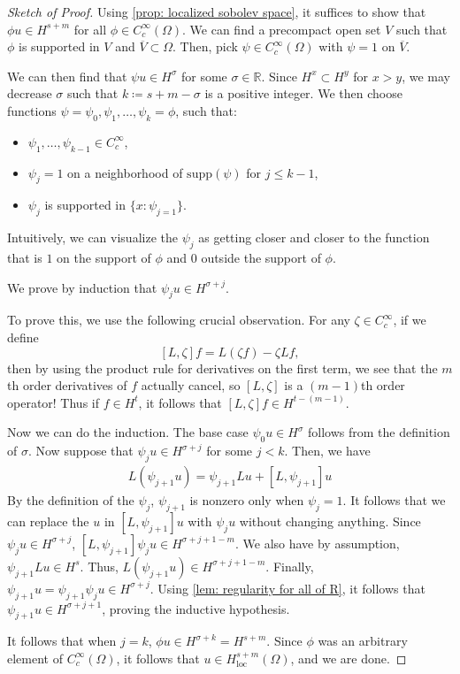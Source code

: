 \documentclass[12pt,letterpaper,reqno]{article}
\theoremstyle{plain}                              %
\theoremstyle{definition}                         %
\theoremstyle{remark}                             %
\numberwithin{equation}{section}
\newcommand{\R}{\mathbb{R}}                     %
\begin{document}
\begin{proof}[Sketch of Proof]
    Using \cref{prop: localized sobolev space}, it suffices to show that $\phi u \in H^{s+m}$ for all $\phi\in C_c^\infty(\Omega)$. We can find a precompact open set $V$ such that $\phi$ is supported in $V$ and $\overline{V}\subset \Omega$. Then, pick $\psi\in C_c^\infty(\Omega)$ with $\psi=1$ on $\overline{V}$. 

    We can then find that $\psi u \in H^{\sigma}$ for some $\sigma\in \R$. Since $H^{x}\subset H^y$ for $x>y$, we may decrease $\sigma$ such that $k \coloneqq s+m-\sigma$ is a positive integer. We then choose functions $\psi = \psi_0,\psi_1,\ldots,\psi_k=\phi$, such that:
    \begin{itemize}
        \item $\psi_1,\ldots,\psi_{k-1}\in C_c^{\infty}$,
        \item $\psi_j = 1$ on a neighborhood of $\mathrm{supp}(\psi)$ for $j\le k-1$,
        \item $\psi_j$ is supported in $\{x: \psi_{j=1}\}$.
    \end{itemize}
    Intuitively, we can visualize the $\psi_j$ as getting closer and closer to the function that is $1$ on the support of $\phi$ and $0$ outside the support of $\phi$.

    We prove by induction that $\psi_j u \in H^{\sigma + j}$.

    To prove this, we use the following crucial observation.
    For any $\zeta \in C_c^\infty$, if we define
    \[[L,\zeta]f = L(\zeta f) - \zeta L f,\]
    then by using the product rule for derivatives on the first term, we see that the $m$th order derivatives of $f$ actually cancel, so $[L,\zeta]$ is a $(m-1)$th order operator! Thus if $f\in H^t$, it follows that $[L,\zeta]f\in H^{t-(m-1)}$. 

    Now we can do the induction. The base case $\psi_0 u \in H^{\sigma}$ follows from the definition of $\sigma$. Now suppose that $\psi_j u \in H^{\sigma + j}$ for some $j<k$. Then, we have
    \begin{align*}
        L(\psi_{j+1}u) = \psi_{j+1}Lu + [L,\psi_{j+1}]u 
    \end{align*}
    By the definition of the $\psi_j$, $\psi_{j+1}$ is nonzero only when $\psi_j =1$. It follows that we can replace the $u$ in $[L,\psi_{j+1}]u$ with $\psi_j u$ without changing anything. Since $\psi_j u \in H^{\sigma + j}$, $[L,\psi_{j+1}]\psi_j u \in H^{\sigma + j + 1-m}$. We also have by assumption, $\psi_{j+1}Lu \in H^s$. Thus, $L(\psi_{j+1}u) \in H^{\sigma+j+ 1 -m}$. Finally, $\psi_{j+1}u = \psi_{j+1}\psi_j u \in H^{\sigma + j}$. Using \cref{lem: regularity for all of R}, it follows that $\psi_{j+1}u\in H^{\sigma + j+1}$, proving the inductive hypothesis.

    It follows that when $j=k$, $\phi u \in H^{\sigma+k}=H^{s+m}$. Since $\phi$ was an arbitrary element of $C_c^\infty(\Omega)$, it follows that $u\in H_\mathrm{loc}^{s+m}(\Omega)$, and we are done.
\end{proof}
\end{document}
